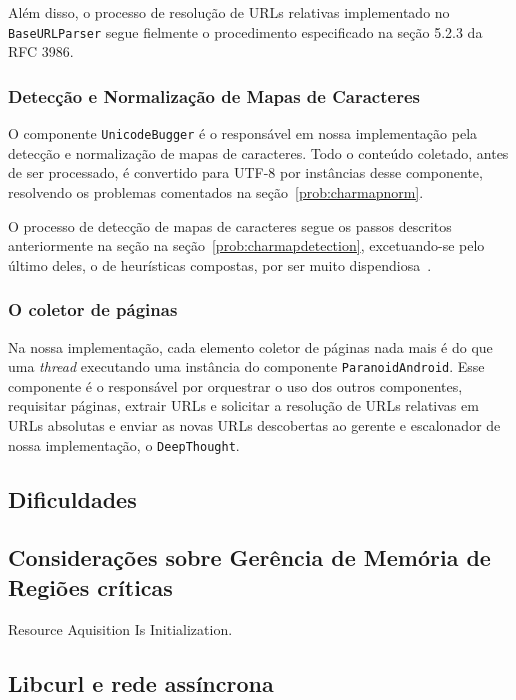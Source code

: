 \documentclass[10pt,twocolumn]{article}
\begin{document}
Além disso, o processo de resolução de URLs relativas implementado no
\texttt{BaseURLParser} segue fielmente o procedimento especificado na
seção 5.2.3 da RFC 3986.

\subsubsection{Detecção e Normalização de Mapas de Caracteres}

O componente \texttt{UnicodeBugger} é o responsável em nossa
implementação pela detecção e normalização de mapas de caracteres.  Todo
o conteúdo coletado, antes de ser processado, é convertido para UTF-8
por instâncias desse componente, resolvendo os problemas comentados na
seção~\ref{prob:charmapnorm}.

O processo de detecção de mapas de caracteres segue os passos descritos
anteriormente na seção na seção~\ref{prob:charmapdetection},
excetuando-se pelo último deles, o de heurísticas compostas, por ser
muito dispendiosa~\cite{mozillaiuc}.

\subsubsection{O coletor de páginas}

Na nossa implementação, cada elemento coletor de páginas nada mais é do
que uma \emph{thread} executando uma instância do componente
\texttt{ParanoidAndroid}. Esse componente é o responsável por orquestrar
o uso dos outros componentes, requisitar páginas, extrair URLs e
solicitar a resolução de URLs relativas em URLs absolutas e enviar as
novas URLs descobertas ao gerente e escalonador de nossa implementação,
o \texttt{DeepThought}.



\subsection{Dificuldades}

\subsection{Considerações sobre Gerência de Memória de Regiões críticas}

Resource Aquisition Is Initialization.

\subsection{Libcurl e rede assíncrona}
\end{document}
